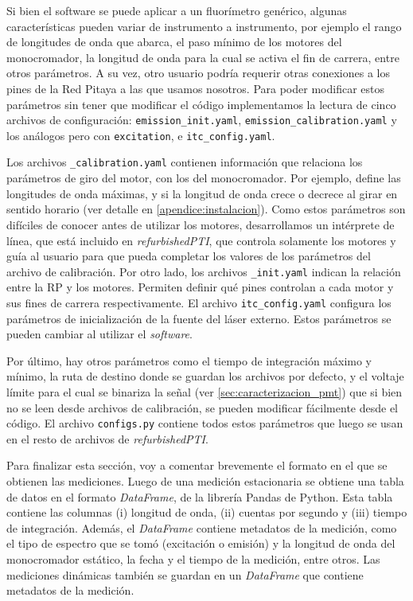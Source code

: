 Si bien el software se puede aplicar a un fluorímetro genérico, algunas características pueden variar de instrumento a instrumento, por ejemplo el rango de longitudes de onda que abarca, el paso mínimo de los motores del monocromador, la longitud de onda para la cual se activa el fin de carrera, entre otros parámetros.
A su vez, otro usuario podría requerir otras conexiones a los pines de la Red Pitaya a las que usamos nosotros.
Para poder modificar estos parámetros sin tener que modificar el código implementamos la lectura de cinco archivos de configuración: \texttt{emission\_init.yaml}, \texttt{emission\_calibration.yaml} y los análogos pero con \texttt{excitation}, e \texttt{itc\_config.yaml}.

Los archivos \texttt{\_calibration.yaml} contienen información que relaciona los parámetros de giro del motor, con los del monocromador. 
Por ejemplo, define las longitudes de onda máximas, y si la longitud de onda crece o decrece al girar en sentido horario (ver detalle en \ref{apendice:instalacion}).
Como estos parámetros son difíciles de conocer antes de utilizar los motores, desarrollamos un intérprete de línea, que está incluido en \textit{refurbishedPTI}, que controla solamente los motores y guía al usuario para que pueda completar los valores de los parámetros del archivo de calibración.
Por otro lado, los archivos \texttt{\_init.yaml} indican la relación entre la RP y los motores.
Permiten definir qué pines controlan a cada motor y sus fines de carrera respectivamente.
El archivo \texttt{itc\_config.yaml} configura los parámetros de inicialización de la fuente del láser externo.
Estos parámetros se pueden cambiar al utilizar el \textit{software}.

Por último, hay otros parámetros como el tiempo de integración máximo y mínimo, la ruta de destino donde se guardan los archivos por defecto, y el voltaje límite para el cual se binariza la señal (ver \ref{sec:caracterizacion_pmt}) que si bien no se leen desde archivos de calibración, se pueden modificar fácilmente desde el código.
El archivo \texttt{configs.py} contiene todos estos parámetros que luego se usan en el resto de archivos de \textit{refurbishedPTI}.

Para finalizar esta sección, voy a comentar brevemente el formato en el que se obtienen las mediciones.
Luego de una medición estacionaria se obtiene una tabla de datos en el formato \textit{DataFrame}, de la librería Pandas de Python.
Esta tabla contiene las columnas (i) longitud de onda, (ii) cuentas por segundo y (iii) tiempo de integración.
Además, el \textit{DataFrame} contiene metadatos de la medición, como el tipo de espectro que se tomó (excitación o emisión) y la longitud de onda del monocromador estático, la fecha y el tiempo de la medición, entre otros.
Las mediciones dinámicas también se guardan en un \textit{DataFrame} que contiene metadatos de la medición.


